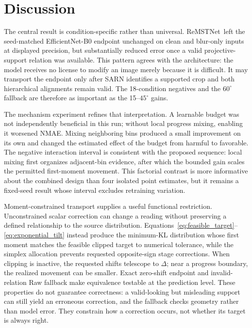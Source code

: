 \documentclass[electronics,article,submit,oneauthor]{Definitions/mdpi}
\newcommand{\modelname}{ReMSTNet}
\begin{document}
\section{Discussion}
\label{sec:discussion}

The central result is condition-specific rather than universal. \modelname\ left the seed-matched EfficientNet-B0 endpoint unchanged on clean and blur-only inputs at displayed precision, but substantially reduced error once a valid projective-support relation was available. This pattern agrees with the architecture: the model receives no license to modify an image merely because it is difficult. It may transport the endpoint only after SARN identifies a supported crop and both hierarchical alignments remain valid. The 18-condition negatives and the $60^{\circ}$ fallback are therefore as important as the 15--$45^{\circ}$ gains.

The mechanism experiment refines that interpretation. A learnable budget was not independently beneficial in this run; without local progress mixing, enabling it worsened NMAE. Mixing neighboring bins produced a small improvement on its own and changed the estimated effect of the budget from harmful to favorable. The negative interaction interval is consistent with the proposed sequence: local mixing first organizes adjacent-bin evidence, after which the bounded gain scales the permitted first-moment movement. This factorial contrast is more informative about the combined design than four isolated point estimates, but it remains a fixed-seed result whose interval excludes retraining variation.

Moment-constrained transport supplies a useful functional restriction. Unconstrained scalar correction can change a reading without preserving a defined relationship to the source distribution. Equations~\eqref{eq:feasible_target}--\eqref{eq:exponential_tilt} instead produce the minimum-KL distribution whose first moment matches the feasible clipped target to numerical tolerance, while the simplex allocation prevents requested opposite-sign stage corrections. When clipping is inactive, the requested shifts telescope to $\Delta$; near a progress boundary, the realized movement can be smaller. Exact zero-shift endpoint and invalid-relation Raw fallback make equivalence testable at the prediction level. These properties do not guarantee correctness: a valid-looking but misleading support can still yield an erroneous correction, and the fallback checks geometry rather than model error. They constrain how a correction occurs, not whether its target is always right.
\end{document}

